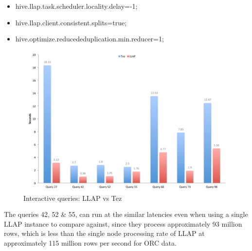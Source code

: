 \begin{itemize}
\item hive.llap.task.scheduler.locality.delay=-1;
\item hive.llap.client.consistent.splits=true;
\item hive.optimize.reducededuplication.min.reducer=1;
\end{itemize}

\begin{figure}[bthp]
\centering
\includegraphics[width=0.8\columnwidth]{figures/tpc-ds.pdf}
\caption{Interactive queries: LLAP vs Tez}
\label{fig:llap_v_tez}
\end{figure} 

The queries 42, 52 \& 55, can run at the similar latencies even when using a single LLAP instance to compare against, since they process
approximately 93 million rows, which is less than the single node processing rate of LLAP at approximately 115 million rows per second  
for ORC data.
